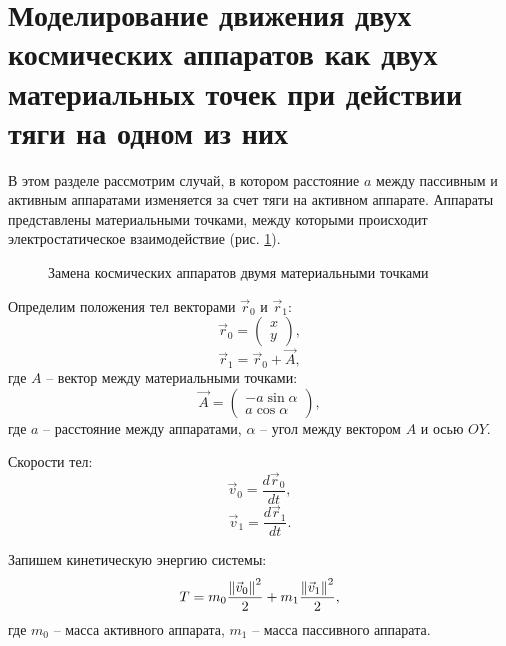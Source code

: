 \section{Моделирование движения двух космических аппаратов как двух материальных точек при действии тяги на одном из них}
\label{SEC:2SPH}

В этом разделе рассмотрим случай, в котором расстояние $a$ между пассивным и активным аппаратами изменяется за счет тяги на активном аппарате.
Аппараты представлены материальными точками, между которыми происходит электростатическое взаимодействие (рис. \ref{ris:2sph}).

\begin{figure}[H]
	\caption{Замена космических аппаратов двумя материальными точками}
	\label{ris:2sph}
\end{figure}

Определим положения тел векторами $\vec{r}_0$ и $\vec{r}_1$:
\begin{equation}
\label{eq:2sph_r0}
	\vec{r}_0 = 
	\begin{pmatrix}
		x\\
		y
	\end{pmatrix},
\end{equation}
\begin{equation}
\label{eq:2sph_r1}
	\vec{r}_1 = \vec{r}_0 + \vec{A},
\end{equation}
где $A$ – вектор между материальными точками:
\begin{equation}
\label{eq:2sph_A}
	\vec{A} = 
	\begin{pmatrix}
		- a \sin \alpha \\
		a \cos \alpha
	\end{pmatrix},
\end{equation}
где $a$ – расстояние между аппаратами, $\alpha$ – угол между вектором $A$ и осью $OY$.

Скорости тел:
\begin{equation}
\label{eq:2sph_v0}
	\vec{v}_0 = \frac{d \vec{r}_0}{dt},
\end{equation}
\begin{equation}
\label{eq:2sph_v1}
	\vec{v}_1 = \frac{d \vec{r}_1}{dt}.
\end{equation}

Запишем кинетическую энергию системы:
\begin{equation}
\label{eq:2sph_T}
	T = m_0 \frac{\left\lVert\vec{v}_0\right\rVert^2}{2} + m_1 \frac{\left\lVert\vec{v}_1\right\rVert^2}{2},
\end{equation}
где $m_0$ – масса активного аппарата, $m_1$ – масса пассивного аппарата.

